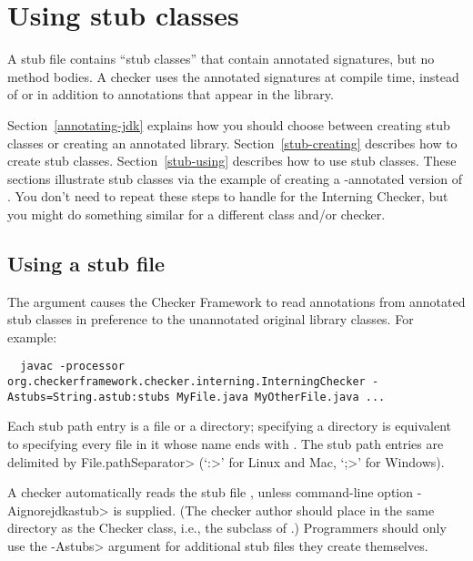 \section{Using stub classes\label{stub}\label{stub-creating-and-using}}

A stub file contains ``stub classes'' that contain annotated signatures,
but no method bodies.  A
checker uses the annotated signatures at compile time, instead of or in
addition to annotations that appear in the library.

Section~\ref{annotating-jdk} explains how you should choose between
creating stub classes or creating an annotated library.
Section~\ref{stub-creating} describes how to create stub classes.
Section~\ref{stub-using} describes how to use stub classes.
These sections illustrate stub classes via the example of creating a -annotated
version of .  You don't need to repeat these steps
to handle  for the Interning Checker,
but you might do something similar for a different class and/or checker.


\subsection{Using a stub file\label{stub-using}}

The  argument causes the Checker Framework to read
annotations from annotated stub classes in preference to the unannotated
original library classes.  For example:

\begin{myxsmall}
\begin{Verbatim}
  javac -processor org.checkerframework.checker.interning.InterningChecker -Astubs=String.astub:stubs MyFile.java MyOtherFile.java ...
\end{Verbatim}
\end{myxsmall}

Each stub path entry is a file or a directory; specifying a directory is
equivalent to specifying every file in it whose name ends with
.  The stub path entries are delimited by
\<File.pathSeparator> (`\<:>' for Linux and Mac, `\<;>' for Windows).

A checker automatically reads the stub file , unless
command-line option \<-Aignorejdkastub> is supplied.  (The checker
author should place  in the same directory as the Checker class, i.e.,
the subclass of .)  Programmers should only use the
\<-Astubs> argument for additional stub files they create themselves.

